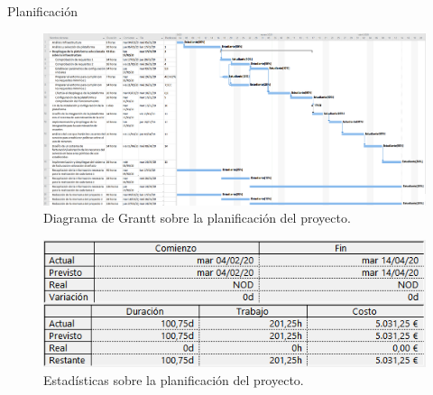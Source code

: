 \begin{chapter}{Planificación}
\begin{landscape}
\begin{figure}[hp]
  \centering
  \includegraphics[width=1.5\textwidth]{imaxes/extras/diagramaGranttt.png}
  \caption{Diagrama de Grantt sobre la planificación del proyecto.}
  \label{fig:tareasproyecto}
\end{figure}
\end{landscape}
\begin{figure}[h!]
  \centering
  \includegraphics[width=1\textwidth]{imaxes/extras/estadisticasProyecto.png}
  \caption{Estadísticas sobre la planificación del proyecto.}
  \label{fig:estadisticasproyecto}
\end{figure}
\FloatBarrier


\end{chapter}
